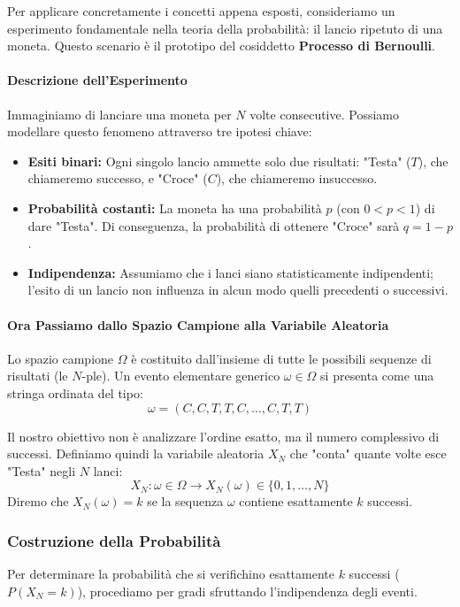 Per applicare concretamente i concetti appena esposti, consideriamo un esperimento fondamentale nella teoria della probabilità: il lancio ripetuto di una moneta. Questo scenario è il prototipo del cosiddetto \textbf{Processo di Bernoulli}.

\paragraph{Descrizione dell'Esperimento}
Immaginiamo di lanciare una moneta per $N$ volte consecutive. Possiamo modellare questo fenomeno attraverso tre ipotesi chiave:
\begin{itemize}
    \item \textbf{Esiti binari:} Ogni singolo lancio ammette solo due risultati: "Testa" ($T$), che chiameremo successo, e "Croce" ($C$), che chiameremo insuccesso.
    \item \textbf{Probabilità costanti:} La moneta ha una probabilità $p$ (con $0 < p < 1$) di dare "Testa". Di conseguenza, la probabilità di ottenere "Croce" sarà $q = 1 - p$.
    \item \textbf{Indipendenza:} Assumiamo che i lanci siano statisticamente indipendenti; l'esito di un lancio non influenza in alcun modo quelli precedenti o successivi.
\end{itemize}

\paragraph{Ora Passiamo dallo Spazio Campione alla Variabile Aleatoria}
Lo spazio campione $\Omega$ è costituito dall'insieme di tutte le possibili sequenze di risultati (le $N$-ple). Un evento elementare generico $\omega \in \Omega$ si presenta come una stringa ordinata del tipo:
\[ \omega = (C, C, T, T, C, \dots, C, T, T) \]

Il nostro obiettivo non è analizzare l'ordine esatto, ma il numero complessivo di successi. Definiamo quindi la variabile aleatoria $X_N$ che "conta" quante volte esce "Testa" negli $N$ lanci:
\[ X_N: \omega \in \Omega \longrightarrow X_N(\omega) \in \{0, 1, \dots, N\} \]
Diremo che $X_N(\omega) = k$ se la sequenza $\omega$ contiene esattamente $k$ successi.

\subsubsection{Costruzione della Probabilità}

Per determinare la probabilità che si verifichino esattamente $k$ successi ($P(X_N=k)$), procediamo per gradi sfruttando l'indipendenza degli eventi.

